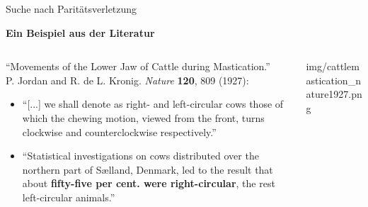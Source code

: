\begin{frame}{Suche nach Parit\"atsverletzung}
    \begin{center}
        \textbf{Ein Beispiel aus der Literatur}
    \end{center}

	\begin{columns}[T]
		\begin{column}{.6\textwidth}
            \enquote{Movements of the Lower Jaw of Cattle during Mastication.}\\
            {\footnotesize P. Jordan and R. de L. Kronig. \textit{Nature} \textbf{120}, 809 (1927):}
            \begin{itemize}
                \item \enquote{[...] we shall denote as right- and left-circular cows those of which the chewing motion, viewed from the front, turns clockwise and counterclockwise respectively.}
                \item \enquote{Statistical investigations on cows distributed over the northern part of S\ae{}lland, Denmark, led to the result that about \textbf{fifty-five per cent. were right-circular}, the rest left-circular animals.}
            \end{itemize}
		\end{column}
		\begin{column}{.4\textwidth}
			\centering
			\begin{overpic}[height=.7\textheight]{img/cattlemastication_nature1927.png}
            \end{overpic}
		\end{column}
    \end{columns}
\end{frame}

